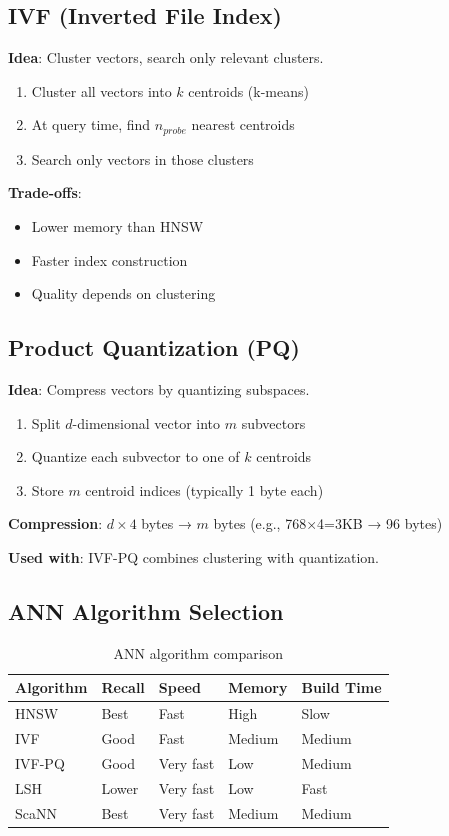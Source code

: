 \subsection{IVF (Inverted File Index)}

\textbf{Idea}: Cluster vectors, search only relevant clusters.

\begin{enumerate}
    \item Cluster all vectors into $k$ centroids (k-means)
    \item At query time, find $n_{probe}$ nearest centroids
    \item Search only vectors in those clusters
\end{enumerate}

\textbf{Trade-offs}:
\begin{itemize}
    \item Lower memory than HNSW
    \item Faster index construction
    \item Quality depends on clustering
\end{itemize}

\subsection{Product Quantization (PQ)}

\textbf{Idea}: Compress vectors by quantizing subspaces.

\begin{enumerate}
    \item Split $d$-dimensional vector into $m$ subvectors
    \item Quantize each subvector to one of $k$ centroids
    \item Store $m$ centroid indices (typically 1 byte each)
\end{enumerate}

\textbf{Compression}: $d \times 4$ bytes → $m$ bytes (e.g., 768×4=3KB → 96 bytes)

\textbf{Used with}: IVF-PQ combines clustering with quantization.

\subsection{ANN Algorithm Selection}

\begin{table}[H]
\centering
\caption{ANN algorithm comparison}
\begin{tabularx}{\textwidth}{lXXXX}
\toprule
\textbf{Algorithm} & \textbf{Recall} & \textbf{Speed} & \textbf{Memory} & \textbf{Build Time} \\
\midrule
HNSW & Best & Fast & High & Slow \\
IVF & Good & Fast & Medium & Medium \\
IVF-PQ & Good & Very fast & Low & Medium \\
LSH & Lower & Very fast & Low & Fast \\
ScaNN & Best & Very fast & Medium & Medium \\
\bottomrule
\end{tabularx}
\end{table}

